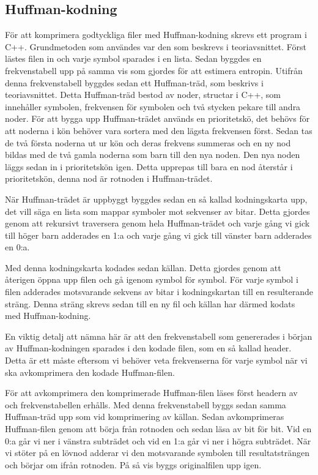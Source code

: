 \subsection{Huffman-kodning}
För att komprimera godtyckliga filer med Huffman-kodning skrevs ett program i C++. Grundmetoden som användes var den som beskrevs i teoriavsnittet. Först lästes filen in och varje symbol sparades i en lista. Sedan byggdes en frekvenstabell upp på samma vis som gjordes för att estimera entropin. Utifrån denna frekvenstabell byggdes sedan ett Huffman-träd, som beskrivs i teoriavsnittet. Detta Huffman-träd bestod av noder, structar i C++, som innehåller symbolen, frekvensen för symbolen och två stycken pekare till andra noder. För att bygga upp Huffman-trädet används en prioritetskö, det behövs för att noderna i kön behöver vara sortera med den lägsta frekvensen först. Sedan tas de två första noderna ut ur kön och deras frekvens summeras och en ny nod bildas med de två gamla noderna som barn till den nya noden. Den nya noden läggs sedan in i prioritetskön igen. Detta upprepas till bara en nod återstår i prioritetskön, denna nod är rotnoden i Huffman-trädet.

När Huffman-trädet är uppbyggt byggdes sedan en så kallad kodningskarta upp, det vill säga en lista som mappar symboler mot sekvenser av bitar. Detta gjordes genom att rekursivt traversera genom hela Huffman-trädet och varje gång vi gick till höger barn adderades en 1:a och varje gång vi gick till vänster barn adderades en 0:a.

Med denna kodningskarta kodades sedan källan. Detta gjordes genom att återigen öppna upp filen och gå igenom symbol för symbol. För varje symbol i filen adderades motsvarande sekvens av bitar i kodningskartan till en resulterande sträng. Denna sträng skrevs sedan till en ny fil och källan har därmed kodats med Huffman-kodning.

En viktig detalj att nämna här är att den frekvenstabell som genererades i början av Huffman-kodningen sparades i den kodade filen, som en så kallad header. Detta är ett måste eftersom vi behöver veta frekvenserna för varje symbol när vi ska avkomprimera den kodade Huffman-filen.

För att avkomprimera den komprimerade Huffman-filen läses först headern av och frekvenstabellen erhålls. Med denna frekvenstabell byggs sedan samma Huffman-träd upp som vid komprimering av källan. Sedan avkomprimeras Huffman-filen genom att börja från rotnoden och sedan läsa av bit för bit. Vid en 0:a går vi ner i vänstra subträdet och vid en 1:a går vi ner i högra subträdet. När vi stöter på en lövnod adderar vi den motsvarande symbolen till resultatsträngen och börjar om ifrån rotnoden. På så vis byggs originalfilen upp igen.
